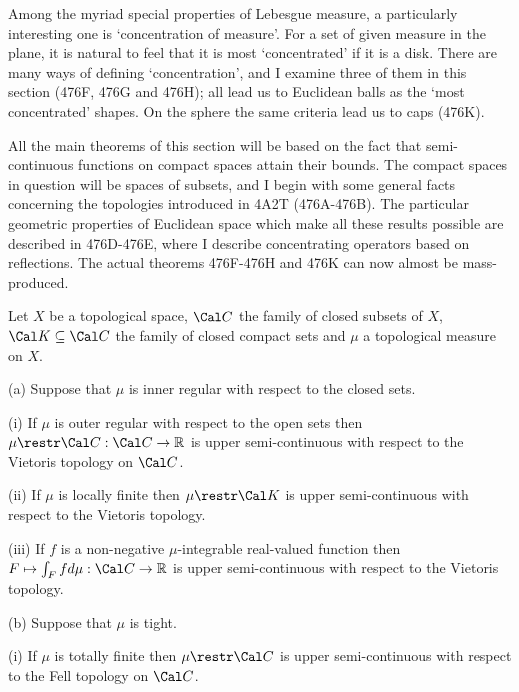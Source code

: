 
\def\varinnerprod#1#2{#1\dotproduct#2}

\def\chaptername{Geometric measure theory}
\def\sectionname{Concentration of measure}


Among the myriad special properties of Lebesgue measure, a particularly
interesting one is `concentration of measure'.   For a set of given
measure in the plane, it is natural to feel that it is most
`concentrated' if it is a disk.   There are many ways of defining
`concentration', and I examine three of them in this section (476F, 476G
and 476H);  all lead us to Euclidean balls as the `most concentrated'
shapes.   On the sphere the same criteria lead us to caps
(476K).

All the main theorems of this section will be based on the fact that
semi-continuous functions on compact spaces attain their bounds.   The
compact spaces in question will be spaces of subsets, and I begin with
some general facts concerning the topologies introduced in 4A2T
(476A-476B).
The particular geometric properties of Euclidean
space which make all these results possible are described in 476D-476E,
where I describe concentrating operators based on reflections.   The
actual theorems 476F-476H %
and 476K can now almost be mass-produced.

 Let $X$ be a topological space,
$\Cal C$ the
family of closed subsets of $X$, $\Cal K\subseteq\Cal C$ the family of
closed compact sets and $\mu$ a topological measure on $X$.

(a) Suppose that $\mu$ is inner regular with respect to the closed sets.

\quad(i) If $\mu$ is outer regular with respect to the open
sets then
$\mu\restr\Cal C:\Cal C\to\Bbb R$ is upper semi-continuous
with respect to the Vietoris topology on
$\Cal C$.

\quad(ii) If $\mu$ is locally finite then
$\mu\restr\Cal K$ is upper semi-continuous
with respect to the Vietoris topology.

\quad(iii) If $f$ is a non-negative $\mu$-integrable real-valued function
then $F\mapsto\int_Ffd\mu:\Cal C\to\Bbb R$ is upper semi-continuous with
respect to the Vietoris topology.

(b) Suppose that $\mu$ is tight.

\quad(i) If $\mu$ is totally finite then
$\mu\restr\Cal C$ is upper semi-continuous
with respect to the Fell topology on $\Cal C$.

